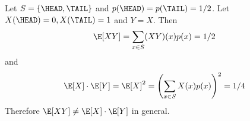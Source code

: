 
Let $S = \{\HEAD, \TAIL\}$ and $p(\HEAD) = p(\TAIL) = 1/2$.
Let $X(\HEAD) = 0, X(\TAIL) = 1$ and $Y = X$.
Then
\[
\E[XY] = \sum_{x \in S} (XY)(x) p(x) = 1/2
\]
and
\[
\E[X] \cdot \E[Y]
= \E[X]^2
= \left( \sum_{x \in S} X(x) p(x) \right)^2
= 1/4
\]
Therefore $\E[XY] \neq \E[X] \cdot \E[Y]$ in general.

    
